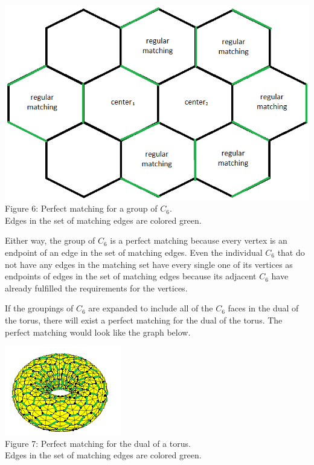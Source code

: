 \documentclass[12pt]{article}
\begin{document}
\begin{flushleft}
\begin{center}
\includegraphics[scale=0.7]{images/c6groupmatching.png}\\
Figure 6: Perfect matching for a group of $C_6$.\\
Edges in the set of matching edges are colored green.
\end{center}

\medskip
Either way, the group of $C_6$ is a perfect matching because every vertex is an endpoint of an edge in the set of matching edges. Even the individual $C_6$ that do not have any edges in the matching set have every single one of its vertices as endpoints of edges in the set of matching edges because its adjacent $C_6$ have already fulfilled the requirements for the vertices.

\medskip
If the groupings of $C_6$ are expanded to include all of the $C_6$ faces in the dual of the torus, there will exist a perfect matching for the dual of the torus. The perfect matching would look like the graph below.

\begin{center}
\includegraphics[scale=1.7]{images/torusmatching.png}\\
Figure 7: Perfect matching for the dual of a torus.\\
Edges in the set of matching edges are colored green.
\end{center}


\end{flushleft}
\end{document}
